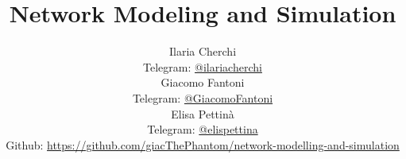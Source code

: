 
\title{\Huge\textbf{Network Modeling and Simulation}}
\author{
  Ilaria Cherchi\\
  \small Telegram: \href{https://t.me/ilariacherchi}{@ilariacherchi} \\[3pt]
  Giacomo Fantoni \\
  \small Telegram: \href{https://t.me/GiacomoFantoni}{@GiacomoFantoni} \\[3pt]
  Elisa Pettin\`a\\
  \small Telegram: \href{https://t.me/elisapettina}{@elispettina} \\[3pt]
\small Github: \href{https://github.com/giacThePhantom/network-modelling-and-simulation}{https://github.com/giacThePhantom/network-modelling-and-simulation}\\}


\maketitle
\tableofcontents

    
    
    
    
    
    
    


